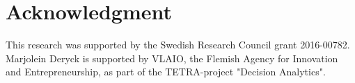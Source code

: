 \section*{Acknowledgment}
This research was supported by the Swedish Research Council grant \mbox{2016-00782}.  Marjolein Deryck is supported by VLAIO, the Flemish Agency for Innovation and Entrepreneurship, as part of the TETRA-project "Decision Analytics".